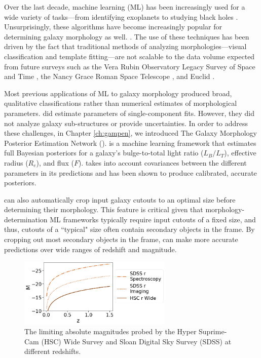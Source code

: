 Over the last decade, machine learning (ML) has been increasingly used for a wide variety of tasks---from identifying exoplanets to studying black holes \citep[e.g.,][]{ml_pz,ml_sz,Shallue2018IdentifyingKepler-90,Sharma2020ApplicationClassification,Natarajan2021QuasarNet:Holes}. Unsurprisingly, these algorithms have become increasingly popular for determining galaxy morphology as well. \citep[e.g.,][]{Dieleman2015Rotation-invariantPrediction, Huertas-Company2015ALEARNING, Tuccillo2018DeepFitting, gamornet_paper, Hausen2020MorpheusData, Walmsley2020GalaxyLearning, Cheng2021GalaxyNetworks, Vega-Ferrero2021PushingSurvey, Tarsitano2022ImageLearning}. The use of these techniques has been driven by the fact that  traditional methods of analyzing morphologies---visual classification and template fitting---are not scalable to the data volume expected from future surveys such as the Vera Rubin Observatory Legacy Survey of Space and Time \citep[LSST;][]{lsst}, the Nancy Grace Roman Space Telescope \citep[NGRST;][]{ngrst}, and Euclid \citep{euclid}. 

Most previous applications of ML to galaxy morphology produced broad, qualitative classifications rather than numerical estimates of morphological parameters. \citet{Tuccillo2018DeepFitting} did estimate parameters of single-component \sersic{} fits. However, they did not analyze galaxy sub-structures or provide uncertainties. In order to address these challenges, in Chapter \ref{ch:gampen}, we introduced The Galaxy Morphology Posterior Estimation Network (\gampen{}). \gampen{} is a machine learning framework that estimates full Bayesian posteriors for a galaxy's bulge-to-total light ratio ($L_B/L_T$), effective radius ($R_e$), and flux ($F$). \gampen{} takes into account covariances between the different parameters in its predictions and has been shown to produce calibrated, accurate posteriors. 

\gampen{} can also automatically crop input galaxy cutouts to an optimal size before determining their morphology. This feature is critical given that morphology-determination ML frameworks typically require input cutouts of a fixed size, and thus, cutouts of a ``typical" size often contain secondary objects in the frame. By cropping out most secondary objects in the frame, \gampen{} can make more accurate predictions over wide ranges of redshift and magnitude. 

\begin{figure}[htb]
    \centering
    \includegraphics[width = 0.65\textwidth]{hsc_depth.png}
    \caption{The limiting absolute magnitudes probed by the Hyper Suprime-Cam (HSC) Wide Survey and Sloan Digital Sky Survey (SDSS) at different redshifts.}
    \label{fig_c3:hsc_depth}
\end{figure}


